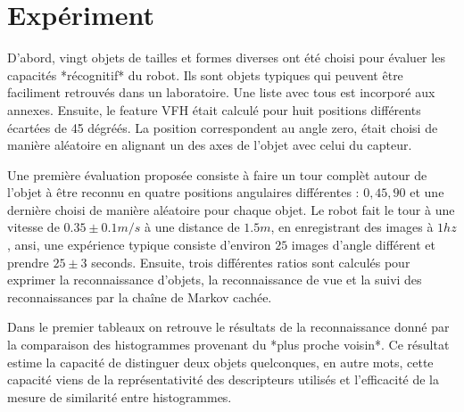 \section {Expériment}

D'abord, vingt objets de tailles et formes diverses ont été choisi pour évaluer les capacités *récognitif* du robot. Ils sont objets typiques qui peuvent être faciliment retrouvés dans un laboratoire. Une liste avec tous est incorporé aux annexes. Ensuite, le feature VFH était calculé pour huit positions différents écartées de 45 dégréés. La position correspondent au angle zero, était choisi de manière aléatoire en alignant un des axes de l'objet avec celui du capteur. 

Une première évaluation proposée consiste à faire un tour complèt autour de l'objet à être reconnu en quatre positions angulaires différentes : $0, 45, 90$ et une dernière choisi de manière aléatoire pour chaque objet. Le robot fait le tour à une vitesse de $0.35 \pm 0.1 m/s$ à une distance de $1.5m$, en enregistrant des images à $1hz$, ansi, une expérience typique consiste d'environ $25$  images d'angle différent et prendre $25 \pm 3$ seconds. Ensuite, trois différentes ratios sont calculés pour exprimer la reconnaissance d'objets, la reconnaissance de vue et la suivi des reconnaissances par la chaîne de Markov cachée.


Dans le premier tableaux on retrouve le résultats de la reconnaissance donné par la comparaison des histogrammes provenant du *plus proche voisin*. Ce résultat estime la capacité de distinguer deux objets quelconques, en autre mots, cette capacité viens de la représentativité des descripteurs utilisés et l'efficacité de la mesure de similarité entre histogrammes.


